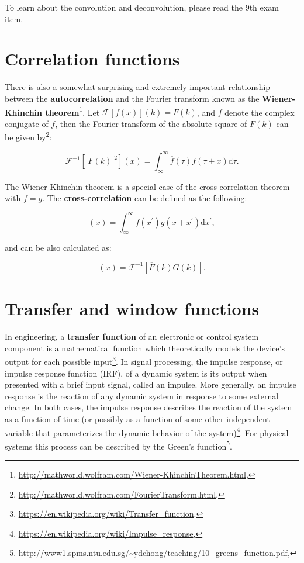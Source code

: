 \documentclass[12pt]{article}
\theoremstyle{plain}
\begin{document}
To learn about the convolution and deconvolution, please read the 9th exam item.

\section{Correlation functions}

There is also a somewhat surprising and extremely important relationship between the \textbf{autocorrelation} and the Fourier transform known as the \textbf{Wiener-Khinchin theorem}\footnote{\url{http://mathworld.wolfram.com/Wiener-KhinchinTheorem.html},}. Let $\mathcal{F}[f(x)](k) = F(k)$, and $\overline{f}$ denote the complex conjugate of $f$, then the Fourier transform of the absolute square of $F(k)$ can be given by\footnote{\url{http://mathworld.wolfram.com/FourierTransform.html},}:

\begin{equation}
\mathcal{F}^{-1} [ |F(k)|^2 ](x) = \int_{\infty}^{\infty} \overline{f}(\tau) f(\tau + x) \text{d} \tau.
\end{equation}

The Wiener-Khinchin theorem is a special case of the cross-correlation theorem with $f=g$. The \textbf{cross-correlation} can be defined as the following:

\begin{equation}
[f \bullet g](x) = \int_{\infty}^{\infty} f(x^{\prime}) g( x + x^{\prime} ) \text{d}x^{\prime},
\end{equation}

and can be also calculated as:

\begin{equation}
[f \bullet g](x) = \mathcal{F}^{-1} [ \overline{F}(k) G(k) ].
\end{equation}

\section{Transfer and window functions}

In engineering, a \textbf{transfer function} of an electronic or control system component is a mathematical function which theoretically models the device's output for each possible input\footnote{\url{https://en.wikipedia.org/wiki/Transfer_function}.}. In signal processing, the impulse response, or impulse response function (IRF), of a dynamic system is its output when presented with a brief input signal, called an impulse. More generally, an impulse response is the reaction of any dynamic system in response to some external change. In both cases, the impulse response describes the reaction of the system as a function of time (or possibly as a function of some other independent variable that parameterizes the dynamic behavior of the system)\footnote{\url{https://en.wikipedia.org/wiki/Impulse_response},}. For physical systems this process can be described by the Green's function\footnote{\url{http://www1.spms.ntu.edu.sg/~ydchong/teaching/10_greens_function.pdf},}.
\end{document}
